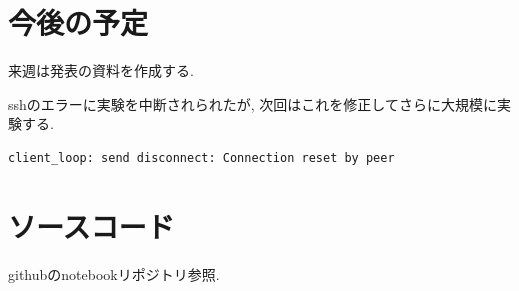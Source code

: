 \documentclass[twocolumn]{jarticle}     %
\begin{document}
\section{今後の予定}

来週は発表の資料を作成する.

sshのエラーに実験を中断されられたが, 次回はこれを修正してさらに大規模に実験する.

\begin{lstlisting}[caption=error log,label=code]
client_loop: send disconnect: Connection reset by peer
\end{lstlisting}


\section{ソースコード}
githubのnotebookリポジトリ参照.



\end{document}
